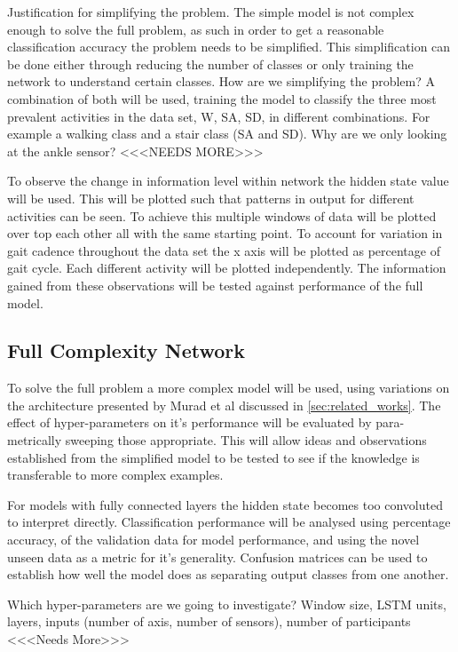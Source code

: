 \documentclass[sensors,article,submit,moreauthors,pdftex]{Definitions/mdpi}
\begin{document}
Justification for simplifying the problem. The simple model is not complex enough to solve the full problem, as such in order to get a reasonable classification accuracy the problem needs to be simplified. This simplification can be done either through reducing the number of classes or only training the network to understand certain classes. How are we simplifying the problem? A combination of both will be used, training the model to classify the three most prevalent activities in the data set, W, SA, SD, in different combinations. For example a walking class and a stair class (SA and SD). Why are we only looking at the ankle sensor? <<<NEEDS MORE>>>

To observe the change in information level within network the hidden state value will be used. This will be plotted such that patterns in output for different activities can be seen. To achieve this multiple windows of data will be plotted over top each other all with the same starting point. To account for variation in gait cadence throughout the data set the x axis will be plotted as percentage of gait cycle. Each different activity will be plotted independently. The information gained from these observations will be tested against performance of the full model.

\subsection{Full Complexity Network}
To solve the full problem a more complex model will be used, using variations on the architecture presented by Murad et al discussed in \ref{sec:related_works}. The effect of hyper-parameters on it's performance will be evaluated by para-metrically sweeping those appropriate. This will allow ideas and observations established from the simplified model to be tested to see if the knowledge is transferable to more complex examples.

For models with fully connected layers the hidden state becomes too convoluted to interpret directly. Classification performance will be analysed using percentage accuracy, of the validation data for model performance, and using the novel unseen data as a metric for it's generality. Confusion matrices can be used to establish how well the model does as separating output classes from one another.

Which hyper-parameters are we going to investigate? Window size, LSTM units, layers, inputs (number of axis, number of sensors), number of participants <<<Needs More>>>
\end{document}
